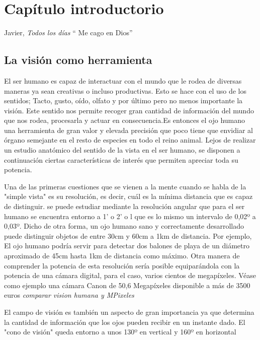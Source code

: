 

\chapter{ Capítulo introductorio}

\begin{chapquote}{Javier, \textit{Todos los días}}
`` Me cago en Dios''
\end{chapquote}

\section{La visión como herramienta}


El ser humano es capaz de interactuar con el mundo que le rodea de diversas maneras ya sean creativas o incluso productivas. Esto se hace con el uso de los sentidos; Tacto, gusto, oído, olfato y por último pero no menos importante la visión. Este sentido nos permite recoger gran cantidad de información del mundo que nos rodea, procesarla y actuar en consecuencia.Es entonces el ojo humano una herramienta de gran valor y elevada precisión que poco tiene que envidiar al órgano semejante en el resto de especies en todo el reino animal. 
Lejos de realizar un estudio anatómico del sentido de la vista en el ser humano, se disponen a continuación ciertas características de interés que permiten apreciar toda su potencia.

Una de las primeras cuestiones que se vienen a la mente cuando se habla de la "simple vista" es su resolución, es decir, cuál es la mínima distancia que es capaz de distinguir. se puede estudiar mediante la resolución angular que para el ser humano se encuentra entorno a 1' o 2' o l que es lo mismo un intervalo de 0,02º a 0,03º. Dicho de otra forma, un ojo humano sano y correctamente desarrollado puede distinguir objetos de entre 30cm y 60cm a 1km de distancia. Por ejemplo, El ojo humano podría servir para detectar dos balones de playa de un diámetro aproximado de 45cm hasta 1km de distancia como máximo. 
Otra manera de comprender la potencia de esta resolución sería posible equiparándola con la potencia de una cámara digital, para el caso, varios cientos de megapíxeles. Véase como ejemplo una cámara Canon de 50,6 Megapíxeles disponible a más de 3500 euros
\textit{comparar vision humana y MPixeles}


El campo de visión es también un aspecto de gran importancia ya que determina la cantidad de información que los ojos pueden recibir en un instante dado. El "cono de visión" queda entorno a unos 130º en vertical y 160º en horizontal


